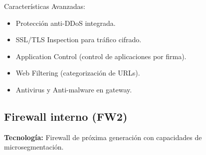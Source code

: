 \documentclass[12pt,letterpaper]{article}
\begin{document}
\noindent Características Avanzadas:
\begin{itemize}
    \item Protección anti-DDoS integrada.
    \item SSL/TLS Inspection para tráfico cifrado.
    \item Application Control (control de aplicaciones por firma).
    \item Web Filtering (categorización de URLs).
    \item Antivirus y Anti-malware en gateway.
\end{itemize}

\subsection{\textcolor{azuloscuro}{Firewall interno (FW2)}}
\noindent\textbf{Tecnología:} Firewall de próxima generación con capacidades de microsegmentación.
\end{document}

